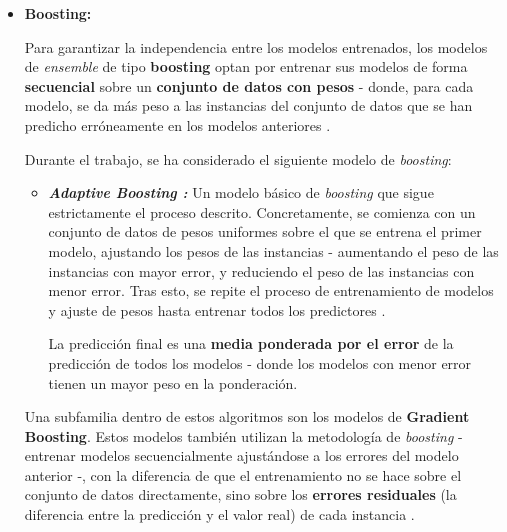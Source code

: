 \begin{itemize}
	\item \textbf{Boosting:}
	
	Para garantizar la independencia entre los modelos entrenados, los modelos de \textit{ensemble} de tipo \textbf{boosting} optan por entrenar sus modelos de forma \textbf{secuencial} sobre un \textbf{conjunto de datos con pesos} - donde, para cada modelo, se da más peso a las instancias del conjunto de datos que se han predicho erróneamente en los modelos anteriores \cite{aima}.
	
	Durante el trabajo, se ha considerado el siguiente modelo de \textit{boosting}:
	
	\begin{itemize}
		\item \textbf{\textit{Adaptive Boosting \cite{adaboost}:}} Un modelo básico de \textit{boosting} que sigue estrictamente el proceso descrito. Concretamente, se comienza con un conjunto de datos de pesos uniformes sobre el que se entrena el primer modelo, ajustando los pesos de las instancias - aumentando el peso de las instancias con mayor error, y reduciendo el peso de las instancias con menor error. Tras esto, se repite el proceso de entrenamiento de modelos y ajuste de pesos hasta entrenar todos los predictores \cite{aima}.
		
		La predicción final es una \textbf{media ponderada por el error} de la predicción de todos los modelos - donde los modelos con menor error tienen un mayor peso en la ponderación.
	\end{itemize}
	
	Una subfamilia dentro de estos algoritmos son los modelos de \textbf{Gradient Boosting}. Estos modelos también utilizan la metodología de \textit{boosting} - entrenar modelos secuencialmente ajustándose a los errores del modelo anterior -, con la diferencia de que el entrenamiento no se hace sobre el conjunto de datos directamente, sino sobre los \textbf{errores residuales} (la diferencia entre la predicción y el valor real) de cada instancia \cite{gradientboosting}. 
	

\end{itemize}

